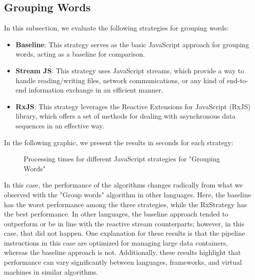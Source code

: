 \subsection{Grouping Words}
\label{subsec:grouping_words_js}

In this subsection, we evaluate the following strategies for grouping words:

\begin{itemize}
    \item \textbf{Baseline}: This strategy serves as the basic JavaScript approach for grouping words, acting as a baseline for comparison.
    \item \textbf{Stream JS}: This strategy uses JavaScript streams, which provide a way to handle reading/writing files, network communications, or any kind of end-to-end information exchange in an efficient manner.
    \item \textbf{RxJS}: This strategy leverages the Reactive Extensions for JavaScript (RxJS) library, which offers a set of methods for dealing with asynchronous data sequences in an effective way.
\end{itemize}

In the following graphic, we present the results in seconds for each strategy: 

\begin{figure}[H]
    \centering
    \caption{Processing times for different JavaScript strategies for "Grouping Words"}
    \label{fig:grouping_words_processing_times_js}
\end{figure}

In this case, the performance of the algorithms changes radically from what we observed with the "Group words" algorithm in other languages. Here, the baseline has the worst performance among the three strategies, while the RxStrategy has the best performance.
In other languages, the baseline approach tended to outperform or be in line with the reactive stream counterparts; however, in this case, that did not happen.
One explanation for these results is that the pipeline instructions in this case are optimized for managing large data containers, whereas the baseline approach is not. Additionally, these results highlight that performance can vary significantly between languages, frameworks, and virtual machines in similar algorithms.